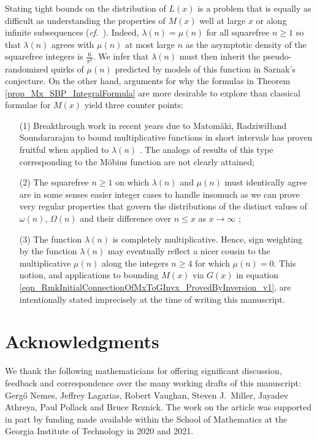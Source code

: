 \documentclass[11pt,reqno,a4letter]{article}
\newcommand{\hlocalref}[1]{\hyperref[#1]{\ref{#1}}}
\numberwithin{equation}{section}
\numberwithin{figure}{section}
\numberwithin{table}{section}
\let\citep\cite
\newcommand{\cf}{\textit{cf.\ }}
\theoremstyle{plain}
\numberwithin{theorem}{section}
\theoremstyle{definition}
\begin{document}
Stating tight bounds on the distribution of 
$L(x)$ is a problem that is equally as difficult 
as understanding the properties of $M(x)$ well at large $x$ or 
along infinite subsequences (\cf \cite{MR2877066,MR3779960,TAO-LOGAVGD-CHOWLA}). 
Indeed, $\lambda(n) = \mu(n)$ for all squarefree $n \geq 1$ so that 
$\lambda(n)$ agrees with $\mu(n)$ at most large $n$ as the asymptotic density of the 
squarefree integers is $\frac{6}{\pi^2}$. 
We infer that $\lambda(n)$ must then inherit the pseudo-randomized quirks 
of $\mu(n)$ predicted by models of this function in Sarnak's conjecture. 
On the other hand, arguments for why the formulas in 
Theorem \hlocalref{prop_Mx_SBP_IntegralFormula} are more desirable to explore than 
classical formulae for $M(x)$ yield three counter points:
\begin{itemize}
\item[(1)] Breakthrough work in recent years due to 
	Matom\"aki, Radziwi\l\l and Soundararajan to 
	bound multiplicative functions 
	in short intervals has 
	proven fruitful when applied to $\lambda(n)$ 
	\cite{SOUND-LLAMBDA-SHORT-INTS,MATRADZE-MULTFUNCS-SHORT-INTS}. 
	The analogs of results of this type corresponding 
	to the M\"obius function are not clearly attained; 
\item[(2)] The squarefree $n \geq 1$ on which $\lambda(n)$ and $\mu(n)$ must identically agree 
	are in some senses easier integer cases to handle 
	insomuch as we can prove very regular properties 
	that govern the distributions of the distinct values of 
	$\omega(n)$, $\Omega(n)$ and their difference over $n \leq x$ as $x \rightarrow \infty$ 
	\citep[\cf \S 2.4; \S 7.4]{MV}; 
\item[(3)] The function $\lambda(n)$ is completely 
	multiplicative. Hence, sign weighting by the function $\lambda(n)$ may eventually reflect 
	a nicer cousin to the multiplicative $\mu(n)$ along the 
	integers $n \geq 4$ for which $\mu(n) = 0$. 
	This notion, and applications to bounding $M(x)$ via $G(x)$ in 
	equation \eqref{eqn_RmkInitialConnectionOfMxToGInvx_ProvedByInversion_v1}, 
	are intentionally stated imprecisely at the time of writing this manuscript.
\end{itemize}

\section*{Acknowledgments}

We thank the following mathematicians for offering significant 
discussion, feedback and correspondence over the 
many working drafts of this manuscript: 
Gerg\H{o} Nemes, Jeffrey Lagarias, Robert Vaughan, Steven J.~Miller, 
Jayadev Athreya, Paul Pollack and Bruce Reznick. 
The work on the article was supported in part by 
funding made available within the School of Mathematics at the 
Georgia Institute of Technology in 2020 and 2021. 
\end{document}
